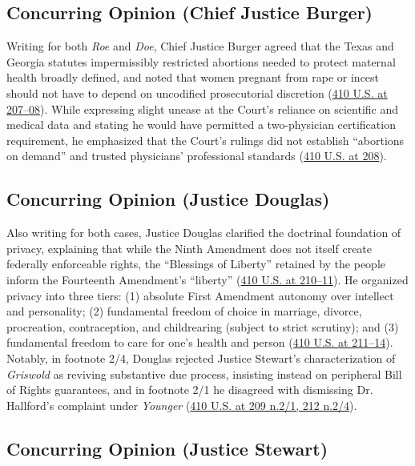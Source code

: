 \documentclass[12pt]{article}
\begin{document}
\subsection{Concurring Opinion (Chief Justice Burger)}

Writing for both \textit{Roe} and \textit{Doe}, Chief Justice Burger agreed that the Texas and Georgia statutes impermissibly restricted abortions needed to protect maternal health broadly defined, and noted that women pregnant from rape or incest should not have to depend on uncodified prosecutorial discretion (\href{https://supreme.justia.com/cases/federal/us/410/179/}{410 U.S. at 207--08}). While expressing slight unease at the Court's reliance on scientific and medical data and stating he would have permitted a two-physician certification requirement, he emphasized that the Court's rulings did not establish ``abortions on demand'' and trusted physicians' professional standards (\href{https://supreme.justia.com/cases/federal/us/410/179/}{410 U.S. at 208}).

\subsection{Concurring Opinion (Justice Douglas)}

Also writing for both cases, Justice Douglas clarified the doctrinal foundation of privacy, explaining that while the Ninth Amendment does not itself create federally enforceable rights, the ``Blessings of Liberty'' retained by the people inform the Fourteenth Amendment's ``liberty'' (\href{https://supreme.justia.com/cases/federal/us/410/179/}{410 U.S. at 210--11}). He organized privacy into three tiers: (1) absolute First Amendment autonomy over intellect and personality; (2) fundamental freedom of choice in marriage, divorce, procreation, contraception, and childrearing (subject to strict scrutiny); and (3) fundamental freedom to care for one's health and person (\href{https://supreme.justia.com/cases/federal/us/410/179/}{410 U.S. at 211--14}). Notably, in footnote 2/4, Douglas rejected Justice Stewart's characterization of \textit{Griswold} as reviving substantive due process, insisting instead on peripheral Bill of Rights guarantees, and in footnote 2/1 he disagreed with dismissing Dr. Hallford's complaint under \textit{Younger} (\href{https://supreme.justia.com/cases/federal/us/410/179/}{410 U.S. at 209 n.2/1, 212 n.2/4}).

\subsection{Concurring Opinion (Justice Stewart)}
\end{document}

